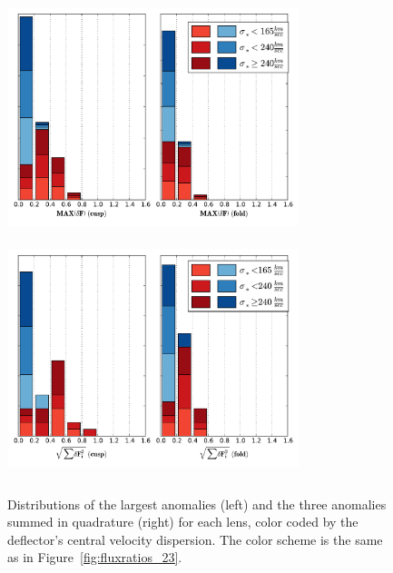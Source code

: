 \begin{figure}
	{\includegraphics[trim=0cm 0cm 0cm .3cm,clip,width=8.5cm, height=6.85cm]{./figures_sls/maxanomaly_disrebinsmooth-eps-converted-to.pdf}}
	{\includegraphics[trim=0cm 0.2cm 0cm 0cm,clip,width=8.5cm, height=7cm]{./figures_sls/sumquad_disrebinsmooth-eps-converted-to.pdf}}
	\caption[Distributions of the largest flux ratio anomalies for \textit{Real HST} and \textit{HST Interpolated} models]{\label{fig:distribution_23}Distributions of the largest anomalies (left) and the three anomalies summed in quadrature (right) for each lens, color coded by the deflector's central velocity dispersion. The color scheme is the same as in Figure~\ref{fig:fluxratios_23}.}
\end{figure} 
